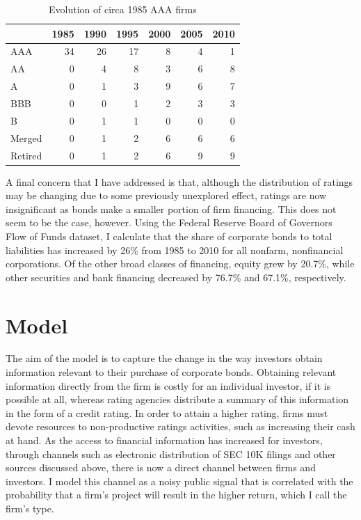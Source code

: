 \documentclass[notitlepage]{article}
\begin{document}
\begin{table}\centering
\begin{tabular}{l *{6}r}
\toprule
  	& 1985  & 1990  & 1995  & 2000  & 2005  & 2010\\ \midrule
AAA  	& 34  	& 26  	& 17  	& 8  	& 4  	& 1\\
AA  	& 0  	& 4  	& 8  	& 3  	& 6  	& 8\\
A  	& 0  	& 1  	& 3  	& 9  	& 6  	& 7\\
BBB  	& 0  	& 0  	& 1  	& 2  	& 3  	& 3\\
B  	& 0  	& 1  	& 1  	& 0  	& 0  	& 0\\
Merged 	& 0  	& 1  	& 2  	& 6  	& 6  	& 6\\
Retired	& 0  	& 1  	& 2  	& 6  	& 9  	& 9\\ 
\bottomrule
\end{tabular}
\caption{Evolution of circa 1985 AAA firms}
\label{tab:mrg}
\end{table}
A final concern that I have addressed is that, although the distribution of ratings may be changing due to some previously unexplored effect, ratings are now insignificant as bonds make a smaller portion of firm financing. This does not seem to be the case, however. Using the Federal Reserve Board of Governors Flow of Funds dataset, I calculate that the share of corporate bonds to total liabilities has increased by 26\% from 1985 to 2010 for all nonfarm, nonfinancial corporations. Of the other broad classes of financing, equity grew by 20.7\%, while other securities and bank financing decreased by 76.7\% and 67.1\%, respectively.

\section{Model}
\label{sec:mod}
The aim of the model is to capture the change in the way investors obtain information relevant to their purchase of corporate bonds. Obtaining relevant information directly from the firm is costly for an individual investor, if it is possible at all, whereas rating agencies distribute a summary of this information in the form of a credit rating. In order to attain a higher rating, firms must devote resources to non-productive ratings activities, such as increasing their cash at hand. As the access to financial information has increased for investors, through channels such as electronic distribution of SEC 10K filings and other sources discussed above, there is now a direct channel between firms and investors. I model this channel as a noisy public signal that is correlated with the probability that a firm's project will result in the higher return, which I call the firm's type. 
\end{document}
